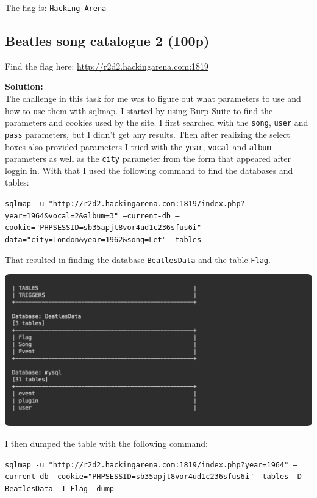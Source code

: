 The flag is: \texttt{Hacking-Arena}

\newpage
\subsection{Beatles song catalogue 2 (100p)}
Find the flag here: \url{http://r2d2.hackingarena.com:1819}

\textbf{Solution:}\\
The challenge in this task for me was to figure out what parameters to use and how to use them with sqlmap.
I started by using Burp Suite to find the parameters and cookies used by the site.
I first searched with the \texttt{song}, \texttt{user} and \texttt{pass} parameters, but I didn't get any results.
Then after realizing the select boxes also provided parameters I tried with the \texttt{year}, \texttt{vocal} and \texttt{album} parameters as well as the \texttt{city} parameter from the form that appeared after loggin in.
With that I used the following command to find the databases and tables:

\texttt{sqlmap -u "http://r2d2.hackingarena.com:1819/index.php?year=1964\&vocal=2\&album=3" --current-db --cookie="PHPSESSID=sb35apjt8vor4ud1c236sfus6i" --data="city=London\&year=1962\&song=Let" --tables}

That resulted in finding the database \texttt{BeatlesData} and the table \texttt{Flag}. 

\begin{center}
    \includegraphics[width=15cm]{img/Web hacking/Beatles song catalogue 2/Screenshot 2023-11-10 at 14.10.27.png}
\end{center}

I then dumped the table with the following command:

\texttt{sqlmap -u "http://r2d2.hackingarena.com:1819/index.php?year=1964" --current-db --cookie="PHPSESSID=sb35apjt8vor4ud1c236sfus6i"  --tables -D BeatlesData -T Flag --dump}

